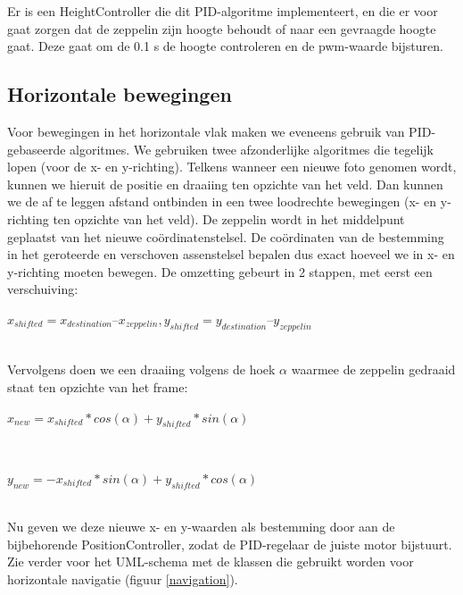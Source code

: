 \documentclass[tt]{penoverslag}
\begin{document}
Er is een HeightController die dit PID-algoritme implementeert, en die er voor gaat zorgen dat de zeppelin zijn hoogte behoudt of naar een gevraagde hoogte gaat. Deze gaat om de 0.1 s de hoogte controleren en de pwm-waarde bijsturen. \\

\subsection{Horizontale bewegingen}
Voor bewegingen in het horizontale vlak maken we eveneens gebruik van PID-gebaseerde algoritmes. We gebruiken twee afzonderlijke algoritmes die tegelijk lopen (voor de x- en y-richting). Telkens wanneer een nieuwe foto genomen wordt, kunnen we hieruit de positie en draaiing ten opzichte van het veld. Dan kunnen we de af te leggen afstand ontbinden in een twee loodrechte bewegingen (x- en y-richting ten opzichte van het veld). De zeppelin wordt in het middelpunt geplaatst van het nieuwe co\"{o}rdinatenstelsel. De co\"{o}rdinaten van de bestemming in het geroteerde en verschoven assenstelsel bepalen dus exact hoeveel we in x- en y-richting moeten bewegen. De omzetting gebeurt in 2 stappen, met eerst een verschuiving:\\
\centerline{$x_{shifted} = x_{destination} – x_{zeppelin}, y_{shifted} = y_{destination} – y_{zeppelin}$}\\

Vervolgens doen we een draaiing volgens de hoek $\alpha$ waarmee de zeppelin gedraaid staat ten opzichte van het frame:\\
\centerline{$x_{new} = x_{shifted}*cos(\alpha) + y_{shifted}*sin(\alpha)$}\\
\centerline{$y_{new} = -x_{shifted}*sin(\alpha) + y_{shifted}*cos(\alpha)$}\\

Nu geven we deze nieuwe x- en y-waarden als bestemming door aan de bijbehorende PositionController, zodat de PID-regelaar de juiste motor bijstuurt. Zie verder voor het UML-schema met de klassen die gebruikt worden voor horizontale navigatie (figuur \ref{navigation}).
\end{document}
